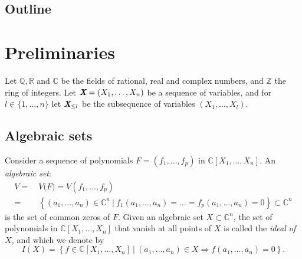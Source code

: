 \documentclass[a4paper]{article}
\def\Xb{\textit{\textbf{X}}}
\newcommand{\ZZ}{{\mathbb{Z}}}
\def\C{\mathbb{C}}
\def\Q{\mathbb{Q}}
\def\R{\mathbb{R}}
\begin{document}
\subsection{Outline}



















\section{Preliminaries}
Let $\Q, \R$ and $\C$ be the fields of rational, real and complex numbers, and $\ZZ$ the ring of integers. Let $\Xb = (X_1, \hdots , X_n)$ be a sequence of variables, and for $l \in \{1,\hdots,n\}$ let $\Xb_{\leq l}$ be the subsequence of variables $(X_1, \hdots , X_l)$.



\subsection{Algebraic sets} 
Consider a sequence of polynomials $F=(f_1,\hdots,f_p)$ in $\C[X_1,\hdots,X_n].$
An \textit{algebraic set}: 
\begin{align*}
V = ~&V\big(F) = V(f_1,\hdots,f_p) \\
= ~&\left\{(a_1,\hdots,a_n) \in \C^n~|~f_1(a_1,\hdots,a_n)=\hdots=f_p(a_1,\hdots,a_n)=0\right\} \subset \C^n
\end{align*}
is the set of common zeros of $F$.  Given an algebraic set $X \subset \C^n$, the set of polynomials in $\C[X_1,\hdots, X_n]$ that vanish at all points of $X$ is called the \textit{ideal of $X$,} and which we denote by 
\[
I(X) = \left\{f \in \C[X_1,\hdots,X_n]~|~(a_1,\hdots,a_n) \in X \Rightarrow f(a_1,\hdots,a_n)=0\right\}. 
\]





\end{document}
